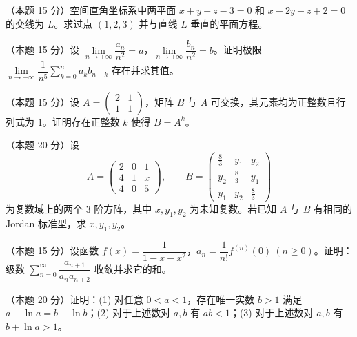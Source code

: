 
\begin{problems}
\item[一、]（本题 15 分）空间直角坐标系中两平面 $x+y+z-3=0$ 和 $x-2y-z+2=0$ 的交线为 $L$。求过点 $(1,2,3)$ 并与直线 $L$ 垂直的平面方程。

\item[二、]（本题 15 分）设 $\lim\limits_{n\to+\infty}\dfrac{a_n}{n^2}=a$，$\lim\limits_{n\to+\infty}\dfrac{b_n}{n^2}=b$。证明极限 $\lim\limits_{n\to+\infty}\dfrac{1}{n^5}\sum\limits_{k=0}^{n}a_kb_{n-k}$ 存在并求其值。

\item[三、]（本题 15 分）设 $A=\begin{pmatrix}2&1\\1&1\end{pmatrix}$，矩阵 $B$ 与 $A$ 可交换，其元素均为正整数且行列式为 $1$。证明存在正整数 $k$ 使得 $B=A^{k}$。

\item[四、]（本题 20 分）设
\[
A=\begin{pmatrix}2&0&1\\4&1&x\\4&0&5\end{pmatrix},\qquad
B=\begin{pmatrix}\frac{8}{3}&y_1&y_2\\y_2&\frac{8}{3}&y_1\\y_1&y_2&\frac{8}{3}\end{pmatrix}
\]
为复数域上的两个 $3$ 阶方阵，其中 $x,y_1,y_2$ 为未知复数。若已知 $A$ 与 $B$ 有相同的 Jordan 标准型，求 $x,y_1,y_2$。

\item[五、]（本题 15 分）设函数 $f(x)=\dfrac{1}{1-x-x^2}$，$a_n=\dfrac{1}{n!}f^{(n)}(0)\ (n\geqslant 0)$。证明：级数 $\sum\limits_{n=0}^{\infty}\dfrac{a_{n+1}}{a_na_{n+2}}$ 收敛并求它的和。

\item[六、]（本题 20 分）证明：(1) 对任意 $0<a<1$，存在唯一实数 $b>1$ 满足 $a-\ln a=b-\ln b$；(2) 对于上述数对 $a,b$ 有 $ab<1$；(3) 对于上述数对 $a,b$ 有 $b+\ln a>1$。
\end{problems}

